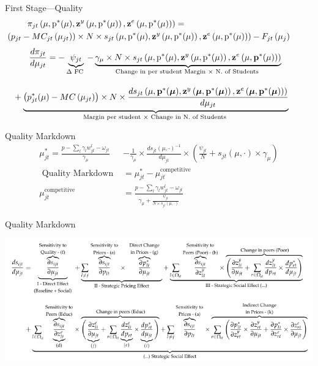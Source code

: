 \documentclass[dvipsnames]{beamer}
\begin{document}
\begin{frame}{First Stage---Quality}
  \[
\begin{aligned}
&\pi_{j t}\left(\mu, \mathrm{p}^{*}(\mu), \mathbf{z}^{y}\left(\mu, \mathrm{p}^{*}(\mu)\right), \mathbf{z}^{e}\left(\mu, \mathrm{p}^{*}(\mu)\right)\right)= \\
&\hspace{-2.5em}\left(p_{j t}-M C_{j t}\left(\mu_{j t}\right)\right) \times N \times s_{j t}\left(\mu, \mathrm{p}^{*}(\mu), \mathbf{z}^{y}\left(\mu, \mathrm{p}^{*}(\mu)\right), \mathbf{z}^{e}\left(\mu, \mathrm{p}^{*}(\mu)\right)\right)-F_{j t}\left(\mu_{j}\right)
\end{aligned}
  \]
  \begin{align*}
    \frac{d \pi_{j t}}{d \mu_{j t}}&=-\underbrace{\psi_{j t}}_{\text {\(\Delta\) FC }}-\underbrace{\gamma_{\mu} \times N \times s_{j t}\left(\mu, \mathrm{p}^{*}(\mu), \mathbf{z}^{y}\left(\mu, \mathrm{p}^{*}(\mu)\right), \mathbf{z}^{e}\left(\mu, \mathbf{p}^{*}(\mu)\right)\right)}_{\text {Change in per student Margin } \times \text { N. of Students }}\\[1em]
    &\hspace{-4em}+\underbrace{\left(p_{j t}^{*}(\mu)-M C\left(\mu_{j t}\right)\right) \times N \times \frac{d s_{j t}\left(\mu, \mathbf{p}^{*}(\boldsymbol{\mu}), \mathbf{z}^{y}\left(\boldsymbol{\mu}, \mathbf{p}^{*}(\boldsymbol{\mu})\right), \mathbf{z}^{e}\left(\boldsymbol{\mu}, \mathbf{p}^{*}(\boldsymbol{\mu})\right)\right)}{d \mu_{j t}}}_{\text {Margin per student } \times \text { Change in N. of Students }}
  \end{align*}
\end{frame}
%
\begin{frame}{Quality Markdown}
  \begin{align*}
\mu_{j t}^{*}=\frac{p-\sum_{l} \gamma_{l} w_{j t}^{l}  -\omega_{j t}}{\gamma_{\mu}}&-\frac{1}{\gamma_{\mu}} \times \frac{d s_{j t}(\mu, \cdot)^{-1}}{d \mu_{j t}} \times\left(\frac{\psi_{j t}}{N}+s_{j t}(\mu, \cdot) \times \gamma_{\mu}\right)\\[2em]
    \text { Quality Markdown }&=\mu_{j t}^{*}-\mu_{j t}^{\text {competitive }}\\[2em]
\mu_{j t}^{\text {competitive }}&=\frac{p-\sum_{l} \gamma_{l} w_{j t}^{l}-\omega_{j t}}{\gamma_{\mu}+\frac{\psi_{j t}}{N \times s_{j t}(\mu, \cdot)}}
  \end{align*}
\end{frame}
%
\begin{frame}{Quality Markdown}
  \begin{center}
    \includegraphics[width=1.05\textwidth, keepaspectratio=true]{figs/quality_markdowns.png}
  \end{center}
\end{frame}
\end{document}
